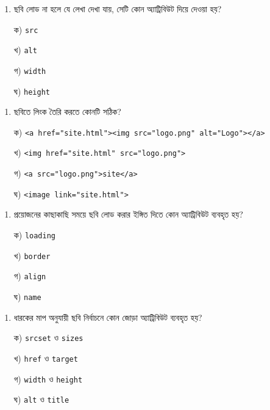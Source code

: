 \par
\par\addvspace{4pt}\noindent
\begin{minipage}[t]{.48\linewidth}\vspace{0pt}
\begin{enumerate}[start=5,leftmargin=*,topsep=0pt,itemsep=0pt]
\item ছবি লোড না হলে যে লেখা দেখা যায়, সেটি কোন অ্যাট্রিবিউট দিয়ে দেওয়া হয়?
\par ক) \texttt{src}
\par খ) \texttt{alt}
\par গ) \texttt{width}
\par ঘ) \texttt{height}
\end{enumerate}
\end{minipage}\hfill
\begin{minipage}[t]{.48\linewidth}\vspace{0pt}
\begin{enumerate}[start=6,leftmargin=*,topsep=0pt,itemsep=0pt]
\item ছবিতে লিংক তৈরি করতে কোনটি সঠিক?
\par ক) \texttt{<a href="site.html"><img src="logo.png" alt="Logo"></a>}
\par খ) \texttt{<img href="site.html" src="logo.png">}
\par গ) \texttt{<a src="logo.png">site</a>}
\par ঘ) \texttt{<image link="site.html">}
\end{enumerate}
\end{minipage}
\par
\par\addvspace{4pt}\noindent
\begin{minipage}[t]{.48\linewidth}\vspace{0pt}
\begin{enumerate}[start=7,leftmargin=*,topsep=0pt,itemsep=0pt]
\item প্রয়োজনের কাছাকাছি সময়ে ছবি লোড করার ইঙ্গিত দিতে কোন অ্যাট্রিবিউট ব্যবহৃত হয়?
\par ক) \texttt{loading}
\par খ) \texttt{border}
\par গ) \texttt{align}
\par ঘ) \texttt{name}
\end{enumerate}
\end{minipage}\hfill
\begin{minipage}[t]{.48\linewidth}\vspace{0pt}
\begin{enumerate}[start=8,leftmargin=*,topsep=0pt,itemsep=0pt]
\item ধারকের মাপ অনুযায়ী ছবি নির্বাচনে কোন জোড়া অ্যাট্রিবিউট ব্যবহৃত হয়?
\par ক) \texttt{srcset} ও \texttt{sizes}
\par খ) \texttt{href} ও \texttt{target}
\par গ) \texttt{width} ও \texttt{height}
\par ঘ) \texttt{alt} ও \texttt{title}
\end{enumerate}
\end{minipage}
\par

